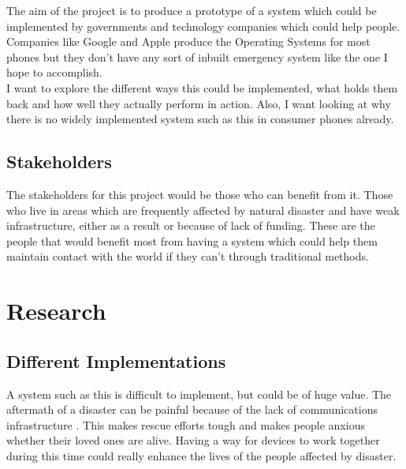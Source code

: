 \documentclass{report}
\begin{document}
The aim of the project is to produce a prototype of a system which could be implemented by governments and technology 
companies which could help people. Companies like Google and Apple produce the Operating Systems for most phones\cite{mobileOS} but 
they don't have any sort of inbuilt emergency system like the one I hope to accomplish. 
\bigskip\\
I want to explore the different ways this could be implemented, what holds them back and how well they actually perform 
in action. Also, I want looking at why there is no widely implemented system such as this in consumer phones already. 

\section*{Stakeholders}

The stakeholders for this project would be those who can benefit from it. Those who live in areas 
which are frequently affected by natural disaster and have weak infrastructure, either as a result or because of lack 
of funding. These are the people that would benefit most from having a system which could help them maintain contact 
with the world if they can't through traditional methods.

\chapter*{Research}

\section*{Different Implementations}
A system such as this is difficult to implement, but could be of huge value. The aftermath of a disaster can be 
painful because of the lack of communications infrastructure \cite{nprDorian}. This makes rescue efforts tough and 
makes people anxious whether their loved ones are alive. Having a way for devices to work together during this time 
could really enhance the lives of the people affected by disaster\cite{sciAmHurr}.
\end{document}
